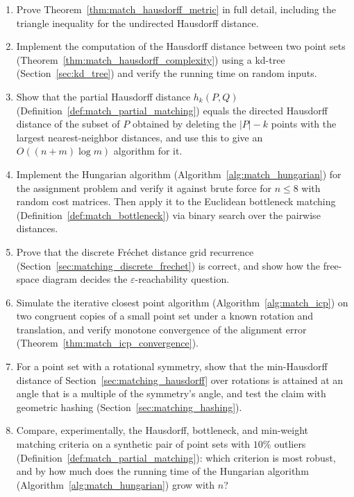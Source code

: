 \begin{enumerate}
  \item Prove Theorem~\ref{thm:match_hausdorff_metric} in full detail,
    including the triangle inequality for the undirected Hausdorff distance.
  \item Implement the computation of the Hausdorff distance between two
    point sets (Theorem~\ref{thm:match_hausdorff_complexity}) using a kd-tree
    (Section~\ref{sec:kd_tree}) and verify the running time on random inputs.
  \item Show that the partial Hausdorff distance $h_k(P,Q)$
    (Definition~\ref{def:match_partial_matching}) equals the directed
    Hausdorff distance of the subset of $P$ obtained by deleting the $|P|-k$
    points with the largest nearest-neighbor distances, and use this to give
    an $O((n + m) \log m)$ algorithm for it.
  \item Implement the Hungarian algorithm
    (Algorithm~\ref{alg:match_hungarian}) for the assignment problem and
    verify it against brute force for $n \le 8$ with random cost matrices.
    Then apply it to the Euclidean bottleneck matching
    (Definition~\ref{def:match_bottleneck}) via binary search over the
    pairwise distances.
  \item Prove that the discrete Fr\'echet distance grid recurrence
    (Section~\ref{sec:matching_discrete_frechet}) is correct, and show how
    the free-space diagram decides the $\varepsilon$-reachability question.
  \item Simulate the iterative closest point algorithm
    (Algorithm~\ref{alg:match_icp}) on two congruent copies of a small point
    set under a known rotation and translation, and verify monotone
    convergence of the alignment error (Theorem~\ref{thm:match_icp_convergence}).
  \item For a point set with a rotational symmetry, show that the min-Hausdorff
    distance of Section~\ref{sec:matching_hausdorff} over rotations is
    attained at an angle that is a multiple of the symmetry's angle, and
    test the claim with geometric hashing
    (Section~\ref{sec:matching_hashing}).
  \item Compare, experimentally, the Hausdorff, bottleneck, and min-weight
    matching criteria on a synthetic pair of point sets with $10\%$ outliers
    (Definition~\ref{def:match_partial_matching}): which criterion is most
    robust, and by how much does the running time of the Hungarian algorithm
    (Algorithm~\ref{alg:match_hungarian}) grow with $n$?
\end{enumerate}

